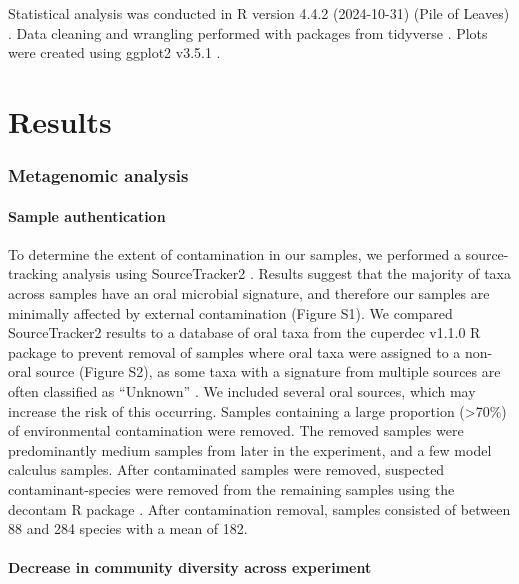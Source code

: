 \documentclass[10pt,a4paper]{article}
\begin{document}
Statistical analysis was conducted in R version 4.4.2 (2024-10-31) (Pile
of Leaves) \citep{Rbase}. Data cleaning and wrangling performed with
packages from tidyverse \citep{tidyverse2019}. Plots were created using
ggplot2 v3.5.1 \citep{ggplot2}.

\section{Results}\label{results}

\subsubsection{Metagenomic analysis}\label{metagenomic-analysis}

\paragraph{Sample authentication}\label{sample-authentication}

To determine the extent of contamination in our samples, we performed a
source-tracking analysis using SourceTracker2
\citep{knightsSourceTracker2011}. Results suggest that the majority of
taxa across samples have an oral microbial signature, and therefore our
samples are minimally affected by external contamination (Figure S1). We
compared SourceTracker2 results to a database of oral taxa from the
cuperdec v1.1.0 R package \citep{yatesOralMicrobiome2021} to prevent
removal of samples where oral taxa were assigned to a non-oral source
(Figure S2), as some taxa with a signature from multiple sources are
often classified as ``Unknown'' \citep{velskoMicrobialDifferences2019}.
We included several oral sources, which may increase the risk of this
occurring. Samples containing a large proportion (\textgreater70\%) of
environmental contamination were removed. The removed samples were
predominantly medium samples from later in the experiment, and a few
model calculus samples. After contaminated samples were removed,
suspected contaminant-species were removed from the remaining samples
using the decontam R package \citep{Rdecontam}. After contamination
removal, samples consisted of between 88 and 284 species with a mean of
182.

\paragraph{Decrease in community diversity across
experiment}\label{decrease-in-community-diversity-across-experiment}
\end{document}

